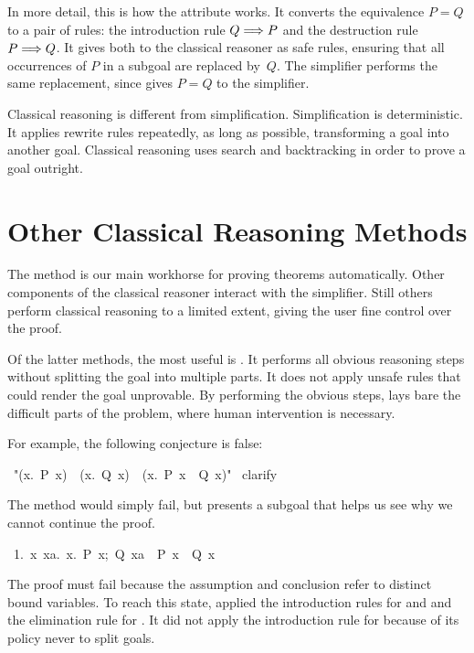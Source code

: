 In more detail, this is how the  attribute works.  It converts
the equivalence $P=Q$ to a pair of rules: the introduction
rule $Q\Longrightarrow P$ and the destruction rule $P\Longrightarrow Q$.  It gives both to the
classical reasoner as safe rules, ensuring that all occurrences of $P$ in
a subgoal are replaced by~$Q$.  The simplifier performs the same
replacement, since  gives $P=Q$ to the
simplifier.  

Classical reasoning is different from
simplification.  Simplification is deterministic.  It applies rewrite rules
repeatedly, as long as possible, transforming a goal into another goal.  Classical
reasoning uses search and backtracking in order to prove a goal outright.%
%


\section{Other Classical Reasoning Methods}
 
The  method is our main workhorse for proving theorems 
automatically. Other components of the classical reasoner interact 
with the simplifier. Still others perform classical reasoning 
to a limited extent, giving the user fine control over the proof. 

Of the latter methods, the most useful is 
.
It performs 
all obvious reasoning steps without splitting the goal into multiple 
parts. It does not apply unsafe rules that could render the 
goal unprovable. By performing the obvious 
steps,  lays bare the difficult parts of the problem, 
where human intervention is necessary. 

For example, the following conjecture is false:
\begin{isabelle}
\ "({\isasymforall}x.\ P\ x)\ \isasymand\
({\isasymexists}x.\ Q\ x)\ \isasymlongrightarrow\ ({\isasymforall}x.\ P\ x\
\isasymand\ Q\ x)"\isanewline
\isacommand{apply}\ clarify
\end{isabelle}
The  method would simply fail, but  presents 
a subgoal that helps us see why we cannot continue the proof. 
\begin{isabelle}
\ 1.\ \isasymAnd x\ xa.\ \isasymlbrakk{\isasymforall}x.\ P\ x;\ Q\
xa\isasymrbrakk\ \isasymLongrightarrow\ P\ x\ \isasymand\ Q\ x
\end{isabelle}
The proof must fail because the assumption \isa{Q\ xa} and conclusion 
refer to distinct bound variables.  To reach this state,  applied
the introduction rules for \isa{\isasymlongrightarrow} and \isa{\isasymforall}
and the elimination rule for \isa{\isasymand}.  It did not apply the introduction
rule for  \isa{\isasymand} because of its policy never to split goals.

